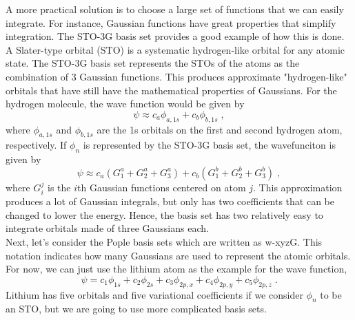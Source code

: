 \documentclass[12pt]{report}
\begin{document}
A more practical solution is to choose a large set of functions that we can
easily integrate.
For instance, Gaussian functions have great properties that simplify
integration.
The STO-3G basis set provides a good example of how this is done.
A Slater-type orbital (STO) is a systematic hydrogen-like orbital for any
atomic state.
The STO-3G basis set represents the STOs of the atoms as the combination of 3
Gaussian functions.
This produces approximate "hydrogen-like" orbitals that have still have the
mathematical properties of Gaussians.
For the hydrogen molecule, the wave function would be given by
\begin{equation}
 \psi \approx c_a\phi_{a,1s}+c_b\phi_{b,1s} \; ,
\end{equation}
where $\phi_{a,1s}$ and $\phi_{b,1s}$ are the 1s orbitals on the first and
second hydrogen atom, respectively.
If $\phi_n$ is represented by the STO-3G basis set, the wavefunciton is given
by
\begin{equation}
 \psi \approx c_a(G^a_1+G^a_2+G^a_3)+c_b(G^b_1+G^b_2+G^b_3) \; ,
\end{equation}
where $G^j_i$ is the $i$th Gaussian functions centered on atom $j$.
This approximation produces a lot of Gaussian integrals, but only has two
coefficients that can be changed to lower the energy.
Hence, the basis set has two relatively easy to integrate orbitals made of
three Gaussians each. \\

Next, let's consider the Pople basis sets which are written as w-xyzG.
This notation indicates how many Gaussians are used to represent the atomic
orbitals.
For now, we can just use the lithium atom as the example for the wave
function,
\begin{equation}
 \psi = c_1\phi_{1s} + c_2\phi_{2s} + c_3\phi_{2p,x} +
 c_4\phi_{2p,y} + c_5\phi_{2p,z} \; .
\end{equation}
Lithium has five orbitals and five variational coefficients if we consider
$\phi_n$ to be an STO, but we are going to use more complicated basis sets. \\
\end{document}
